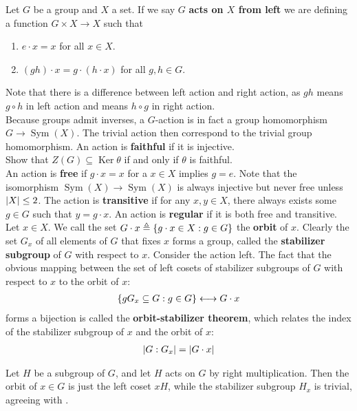 \documentclass{report}
\begin{document}
Let $G$ be a group and $X$ a set. If we say  $G$ \textbf{acts on $X$ from left} we are defining a function $G \times X\rightarrow X$ such that 
\begin{enumerate}[label=(\roman*)]
  \item $e\cdot x=x$ for all $x\in X$. 
  \item $(gh)\cdot x= g \cdot (h \cdot x)$ for all $g,h \in G$. 
\end{enumerate}
Note that there is a difference between left action and right action, as $gh$ means $g \circ h$ in left action and means $h \circ g$ in right action. \\






Because groups admit inverses, a $G$-action is in fact a group homomorphism $G \rightarrow \operatorname{Sym}(X)$. The trivial action then correspond to the trivial group homomorphism.  An action is \textbf{faithful} if it is injective. \\


Show that $Z(G)\subseteq \operatorname{Ker} \theta$ if and only if $\theta$ is faithful.  \\


An action is \textbf{free} if $g\cdot x=x$ for a $x\in X$ implies $g=e$. Note that the isomorphism $\operatorname{Sym}(X)\rightarrow \operatorname{Sym}(X)$ is always injective but never free unless $\left|X\right|\leq 2$. The action is \textbf{transitive} if for any $x,y \in X$, there always exists some $g \in G$ such that $y= g \cdot x$. An action is \textbf{regular} if it is both free and transitive.\\

Let $x \in X$. We call the set $G\cdot x\triangleq \left\{ g\cdot x \in X: g\in G  \right\}$ the \textbf{orbit} of $x$. Clearly the set $G_x$ of all elements of $G$ that fixes $x$ forms a group, called the \textbf{stabilizer subgroup} of $G$ with respect to $x$. Consider the action left. The fact that the obvious mapping between the set of left cosets of stabilizer subgroups of $G$ with respect to $x$ to the orbit of  $x$: 
\begin{align*}
\left\{ g G_x \subseteq G : g \in G \right\} \longleftrightarrow G \cdot x
\end{align*}
\label{THost}
forms a bijection is called the \textbf{orbit-stabilizer theorem}, which relates the index of the stabilizer subgroup of $x$ and the orbit of $x$:  
\begin{align*}
\left|G:G_x\right|=\left|G \cdot x\right|
\end{align*}
\begin{example}
Let $H$ be a subgroup of  $G$, and let $H$ acts on  $G$ by right multiplication. Then the orbit of $x\in G$ is just the left coset $xH$, while the stabilizer subgroup $H_x$ is trivial, agreeing with  .  
\end{example}
\end{document}
